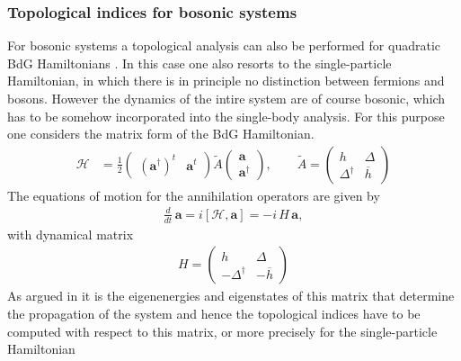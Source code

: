 \subsubsection{Topological indices for bosonic systems}
For bosonic systems a topological analysis can also be performed for quadratic BdG Hamiltonians \cite{peanoTopologicalEdgeStates2018}. In this case one also resorts to the single-particle Hamiltonian, in which there is in principle no distinction between fermions and bosons. However the dynamics of the intire system are of course bosonic, which has to be somehow incorporated into the single-body analysis. For this purpose one considers the matrix form of the BdG Hamiltonian.
 \begin{align*}
    \mathcal{H} &= \frac{1}{2}\begin{pmatrix} (\mathbf{a}^\dagger)^t & \mathbf{a}^t \end{pmatrix} \tilde{A} 
\begin{pmatrix} \mathbf{a} \\ \mathbf{a}^\dagger \end{pmatrix},
\qquad
\tilde{A} = \begin{pmatrix} h & \Delta \\ \Delta^\dagger &  \overline{h} \end{pmatrix} 
\end{align*}
The equations of motion for the annihilation operators are given by
\begin{align}\label{eq:Heisenberg}
    \frac{d}{dt}\,\mathbf{a}=i\left[\mathcal{H},\mathbf{a}\right]=-i\,H\,\mathbf{a},
\end{align}
with dynamical matrix 
\begin{align*}
    H = \begin{pmatrix} h & \Delta \\ -\Delta^\dagger &  -\overline{h} \end{pmatrix} 
\end{align*}
As argued in \cite{peanoTopologicalEdgeStates2018} it is the eigenenergies and eigenstates of this matrix that determine the propagation of the system and hence the topological indices have to be computed with respect to this matrix, or more precisely for the single-particle Hamiltonian
